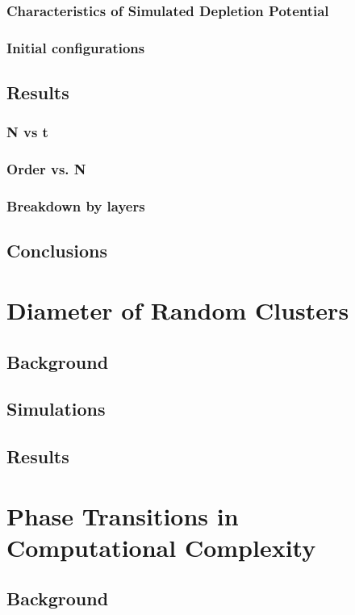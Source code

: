 \documentclass{umthesis}
\begin{document}
\subsection{Characteristics of Simulated Depletion Potential}
\label{sec-2.2.3}
\subsection{Initial configurations}
\label{sec-2.2.4}
\section{Results}
\label{sec-2.3}
\subsection{N vs t}
\label{sec-2.3.1}
\subsection{Order vs. N}
\label{sec-2.3.2}
\subsection{Breakdown by layers}
\label{sec-2.3.3}
\section{Conclusions}
\label{sec-2.4}
\chapter{Diameter of Random Clusters}
\label{sec-3}
\section{Background}
\label{sec-3.1}
\section{Simulations}
\label{sec-3.2}
\section{Results}
\label{sec-3.3}
\chapter{Phase Transitions in Computational Complexity}
\label{sec-4}
\section{Background}
\label{sec-4.1}
\end{document}
